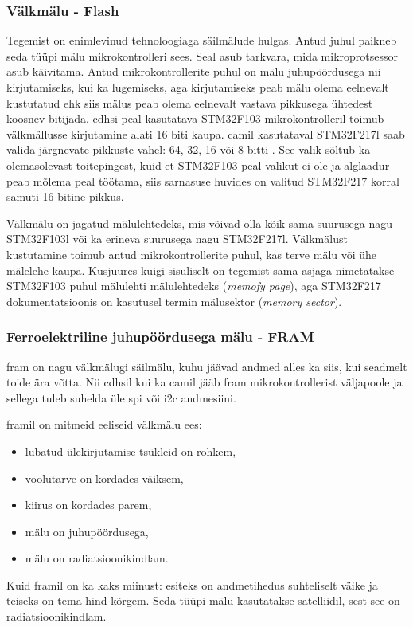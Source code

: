 \documentclass[12pt,a4paper]{article}
\begin{document}
\subsubsection{Välkmälu - Flash}
Tegemist on enimlevinud tehnoloogiaga säilmälude hulgas. Antud juhul paikneb
seda tüüpi mälu mikrokontrolleri sees. Seal asub tarkvara, mida mikroprotsessor
asub käivitama. Antud mikrokontrollerite puhul on mälu juhupöördusega nii
kirjutamiseks, kui ka lugemiseks, aga kirjutamiseks peab mälu olema eelnevalt
kustutatud ehk siis mälus peab olema eelnevalt vastava pikkusega ühtedest
koosnev bitijada. \gls{cdhs}i peal kasutatava STM32F103 mikrokontrolleril toimub
välkmällusse kirjutamine alati 16 biti kaupa. \gls{cam}il kasutataval STM32F217l
saab valida järgnevate pikkuste vahel: 64, 32, 16 või 8 bitti \cite{f2fpm}. See
valik sõltub ka olemasolevast toitepingest, kuid et STM32F103 peal valikut ei
ole ja alglaadur peab mõlema peal töötama, siis sarnasuse huvides on valitud
STM32F217 korral samuti 16 bitine pikkus.

Välkmälu on jagatud mälulehtedeks, mis võivad olla kõik sama suurusega nagu
STM32F103l või ka erineva suurusega nagu STM32F217l. Välkmälust kustutamine
toimub antud mikrokontrollerite puhul, kas terve mälu või ühe mälelehe kaupa.
Kusjuures kuigi sisuliselt on tegemist sama asjaga nimetatakse STM32F103 puhul
mälulehti mälulehtedeks (\textit{memofy page}), aga STM32F217 dokumentatsioonis
on kasutusel termin mälusektor (\textit{memory sector}). \cite{f1fpm,f2fpm}

\subsubsection{Ferroelektriline juhupöördusega mälu - FRAM}
\gls{fram} on nagu välkmälugi säilmälu, kuhu jäävad andmed alles ka siis, kui seadmelt
toide ära võtta. Nii \gls{cdhs}il kui ka \gls{cam}il jääb \gls{fram} mikrokontrollerist väljapoole
ja sellega tuleb suhelda üle \gls{spi} või \gls{i2c} andmesiini.

\gls{fram}il on mitmeid eeliseid välkmälu ees:
\begin{itemize}
	\item lubatud ülekirjutamise tsükleid on rohkem,
	\item voolutarve on kordades väiksem,
	\item kiirus on kordades parem,
	\item mälu on juhupöördusega,
	\item mälu on radiatsioonikindlam.
\end{itemize}
Kuid \gls{fram}il on ka kaks miinust: esiteks on andmetihedus suhteliselt väike ja teiseks
on tema hind kõrgem. Seda tüüpi mälu kasutatakse satelliidil, sest see on
radiatsioonikindlam. \cite{fram}
\end{document}
